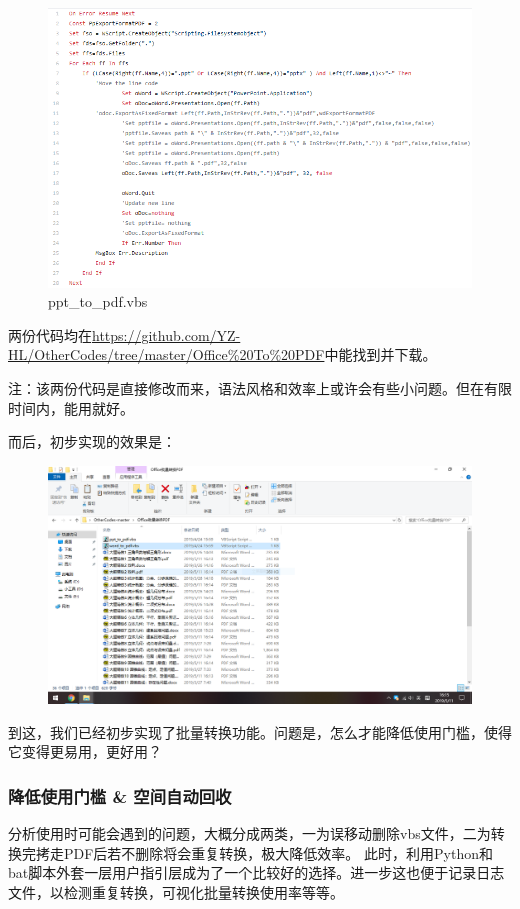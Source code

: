 \documentclass{article}
\begin{document}
        \begin{figure}[htbp]
        \centering
        \includegraphics[scale=0.38]{2.2-p3.png}
        \caption*{ppt\_to\_pdf.vbs}
        \end{figure}

        两份代码均在\url{https://github.com/YZ-HL/OtherCodes/tree/master/Office%20To%20PDF}中能找到并下载。

        注：该两份代码是直接修改而来，语法风格和效率上或许会有些小问题。但在有限时间内，能用就好。

        而后，初步实现的效果是：

        \begin{figure}[htbp]
        \centering
        \includegraphics[scale=0.5]{2.2-p4.png}
        \end{figure}

        到这，我们已经初步实现了批量转换功能。问题是，怎么才能降低使用门槛，使得它变得更易用，更好用？

        \subsubsection{降低使用门槛 \& 空间自动回收}
        分析使用时可能会遇到的问题，大概分成两类，一为误移动删除vbs文件，二为转换完拷走PDF后若不删除将会重复转换，极大降低效率。
        此时，利用Python和bat脚本外套一层用户指引层成为了一个比较好的选择。进一步这也便于记录日志文件，以检测重复转换，可视化批量转换使用率等等。
\end{document}
